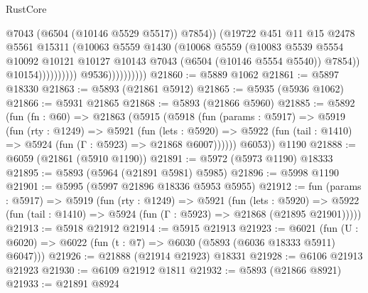 \begin{lexlean}{RustCore}
\begin{coremodule}
                                            @7043
                                            (@6504 (@10146 @5529 @5517))
                                            @7854))
                                        (@19722
                                          @451
                                          @11
                                          @15
                                          @2478
                                          @5561
                                          @15311
                                          (@10063
                                            @5559
                                            @1430
                                            (@10068
                                              @5559
                                              (@10083
                                                @5539
                                                @5554
                                                @10092
                                                @10121
                                                @10127
                                                @10143
                                                @7043
                                                (@6504 (@10146 @5554 @5540))
                                                @7854))
                                            @10154))))))))))
                        @9536))))))))))
@21860 := @5889 @1062
@21861 := @5897 @18330
@21863 := @5893 (@21861 @5912)
@21865 := @5935 (@5936 @1062)
@21866 := @5931 @21865
@21868 := @5893 (@21866 @5960)
@21885 := @5892
    (fun (fn : @60) =>
    @21863
      (@5915
        (@5918
          (fun (params : @5917) =>
          @5919
            (fun (rty : @1249) =>
            @5921
              (fun (lets : @5920) =>
              @5922 (fun (tail : @1410) => @5924 (fun (Γ : @5923) => @21868 @6007))))))
        @6053))
    @1190
@21888 := @6059 (@21861 (@5910 @1190))
@21891 := @5972 (@5973 @1190) @18333
@21895 := @5893 (@5964 (@21891 @5981) @5985)
@21896 := @5998 @1190
@21901 := @5995 (@5997 @21896 @18336 @5953 @5955)
@21912 := fun (params : @5917) =>
  @5919
    (fun (rty : @1249) =>
    @5921
      (fun (lets : @5920) =>
      @5922 (fun (tail : @1410) => @5924 (fun (Γ : @5923) => @21868 (@21895 @21901)))))
@21913 := @5918 @21912
@21914 := @5915 @21913
@21923 := @6021
    (fun (U : @6020) => @6022 (fun (t : @7) => @6030 (@5893 (@6036 @18333 @5911) @6047)))
@21926 := @21888 (@21914 @21923) @18331
@21928 := @6106 @21913 @21923
@21930 := @6109 @21912 @1811
@21932 := @5893 (@21866 @8921)
@21933 := @21891 @8924

\end{coremodule}
\end{lexlean}
